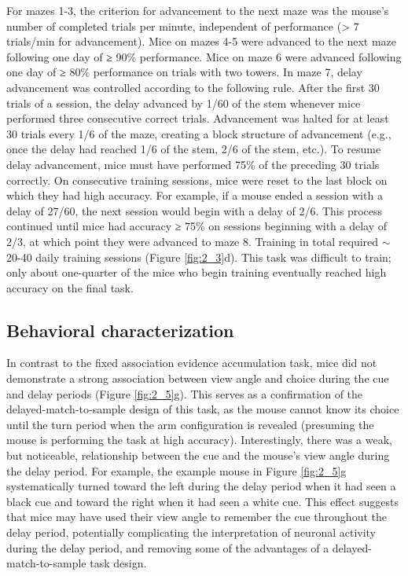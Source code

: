 \bigskip
For mazes 1-3, the criterion for advancement to the next maze was the mouse’s number of completed trials per minute, independent of performance (> 7 trials/min for advancement). Mice on mazes 4-5 were advanced to the next maze following one day of ≥ 90\% performance. Mice on maze 6 were advanced following one day of ≥ 80\% performance on trials with two towers. In maze 7, delay advancement was controlled according to the following rule. After the first 30 trials of a session, the delay advanced by 1/60 of the stem whenever mice performed three consecutive correct trials. Advancement was halted for at least 30 trials every 1/6 of the maze, creating a block structure of advancement (e.g., once the delay had reached 1/6 of the stem, 2/6 of the stem, etc.). To resume delay advancement, mice must have performed 75\% of the preceding 30 trials correctly. On consecutive training sessions, mice were reset to the last block on which they had high accuracy. For example, if a mouse ended a session with a delay of 27/60, the next session would begin with a delay of 2/6. This process continued until mice had accuracy ≥ 75\% on sessions beginning with a delay of 2/3, at which point they were advanced to maze 8. Training in total required $\sim$20-40 daily training sessions (Figure \ref{fig:2_3}d). This task was difficult to train; only about one-quarter of the mice who begin training eventually reached high accuracy on the final task. 

\subsection{Behavioral characterization} \label{sec:dms_behav}

In contrast to the fixed association evidence accumulation task, mice did not demonstrate a strong association between view angle and choice during the cue and delay periods (Figure \ref{fig:2_5}g). This serves as a confirmation of the delayed-match-to-sample design of this task, as the mouse cannot know its choice until the turn period when the arm configuration is revealed (presuming the mouse is performing the task at high accuracy). Interestingly, there was a weak, but noticeable, relationship between the cue and the mouse’s view angle during the delay period. For example, the example mouse in Figure \ref{fig:2_5}g systematically turned toward the left during the delay period when it had seen a black cue and toward the right when it had seen a white cue. This effect suggests that mice may have used their view angle to remember the cue throughout the delay period, potentially complicating the interpretation of neuronal activity during the delay period, and removing some of the advantages of a delayed-match-to-sample task design. 

